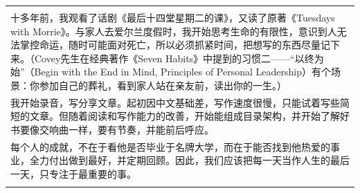 \begin{longtable}[]{@{}l@{}}
\begin{minipage}[t]{0.97\columnwidth}
\textbf{故事三}：\\
十多年前，我观看了话剧《最后十四堂星期二的课》，又读了原著《Tuesdays
with
Morrie》。与家人去爱尔兰度假时，我开始思考生命的有限性，意识到人无法掌控命运，随时可能面对死亡，所以必须抓紧时间，把想写的东西尽量记下来。（Covey先生在经典著作《Seven
Habits》中提到的习惯二------``以终为始''（Begin with the End in Mind,
Principles of Personal
Leadership）有个场景：你参加自己的葬礼，看到家人站在亲友前，读出你的一生。）\\
我开始录音，写分享文章。起初因中文基础差，写作速度很慢，只能试着写些简短的文章。但随着阅读和写作能力的改善，开始能组成目录架构，并开始了解好书要像交响曲一样，要有节奏，并能前后呼应。\\
每个人的成就，不在于看他是否毕业于名牌大学，而在于能否找到他热爱的事业，全力付出做到最好，并定期回顾。因此，我们应该把每一天当作人生的最后一天，只专注于最重要的事。\\
\strut
\end{minipage}\tabularnewline
\bottomrule
\end{longtable}


